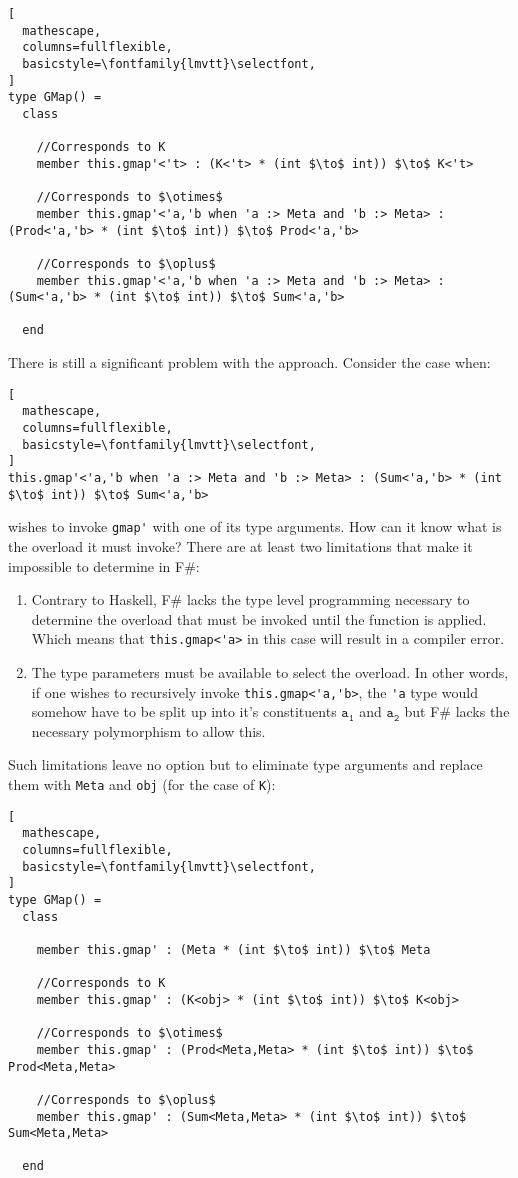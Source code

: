 \documentclass[8pt]{extarticle}
\begin{document}
\begin{lstlisting}[
  mathescape,
  columns=fullflexible,
  basicstyle=\fontfamily{lmvtt}\selectfont,
]
type GMap() =
  class

    //Corresponds to K
    member this.gmap'<'t> : (K<'t> * (int $\to$ int)) $\to$ K<'t>
    
    //Corresponds to $\otimes$
    member this.gmap'<'a,'b when 'a :> Meta and 'b :> Meta> : (Prod<'a,'b> * (int $\to$ int)) $\to$ Prod<'a,'b>

    //Corresponds to $\oplus$
    member this.gmap'<'a,'b when 'a :> Meta and 'b :> Meta> : (Sum<'a,'b> * (int $\to$ int)) $\to$ Sum<'a,'b>

  end
\end{lstlisting}
There is still a significant problem with the approach. Consider the case when:
\begin{lstlisting}[
  mathescape,
  columns=fullflexible,
  basicstyle=\fontfamily{lmvtt}\selectfont,
]
this.gmap'<'a,'b when 'a :> Meta and 'b :> Meta> : (Sum<'a,'b> * (int $\to$ int)) $\to$ Sum<'a,'b>
\end{lstlisting}
wishes to invoke \verb+gmap'+ with one of its type arguments. How can it know what is the overload it must invoke? There are at least two limitations that make it impossible to determine in F\#:
\begin{enumerate}
\item Contrary to Haskell, F\# lacks the type level programming necessary to determine the overload that must be invoked until the function is applied. Which means that \verb+this.gmap<'a>+ in this case will result in a compiler error.
\item The type parameters must be available to select the overload. In other words, if one wishes to recursively invoke \verb+this.gmap<'a,'b>+, the \verb+'a+ type would somehow have to be split up into it's constituents $\mathtt{a_1}$ and $\mathtt{a_2}$ but F\# lacks the necessary polymorphism to allow this.
\end{enumerate}
Such limitations leave no option but to eliminate type arguments and replace them with \verb+Meta+ and \verb+obj+ (for the case of \verb+K+):
\begin{lstlisting}[
  mathescape,
  columns=fullflexible,
  basicstyle=\fontfamily{lmvtt}\selectfont,
]
type GMap() =
  class

    member this.gmap' : (Meta * (int $\to$ int)) $\to$ Meta

    //Corresponds to K
    member this.gmap' : (K<obj> * (int $\to$ int)) $\to$ K<obj>
    
    //Corresponds to $\otimes$
    member this.gmap' : (Prod<Meta,Meta> * (int $\to$ int)) $\to$ Prod<Meta,Meta>

    //Corresponds to $\oplus$
    member this.gmap' : (Sum<Meta,Meta> * (int $\to$ int)) $\to$ Sum<Meta,Meta>

  end
\end{lstlisting}
\end{document}
